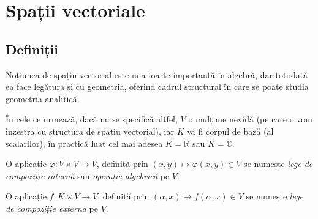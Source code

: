 \chapter{Spații vectoriale}


\section{Definiții}

\indent\indent Noțiunea de spațiu vectorial este una foarte importantă în 
algebră, dar totodată ea face legătura și cu geometria, oferind cadrul 
structural în care se poate studia geometria analitică.

În cele ce urmează, dacă nu se specifică altfel, $V$ o mulțime nevidă 
(pe care o vom înzestra cu structura de spațiu vectorial), iar $K$ va fi 
corpul de bază (al scalarilor), în practică luat cel mai adesea 
$K = \mathbb{R}$ sau $K = \mathbb{C}$.

\begin{definition}
O aplicație $\varphi : V \times V \to V$, definită prin 
$(x, y) \mapsto \varphi(x, y) \in V$ se numește \emph{lege de compoziție 
internă} sau \emph{operație algebrică} pe $V$.

O aplicație $f : K \times V \to V$, definită prin $(\alpha, x) \mapsto 
f(\alpha, x) \in V$ se numește \emph{lege de compoziție externă} pe $V$.
\end{definition}

